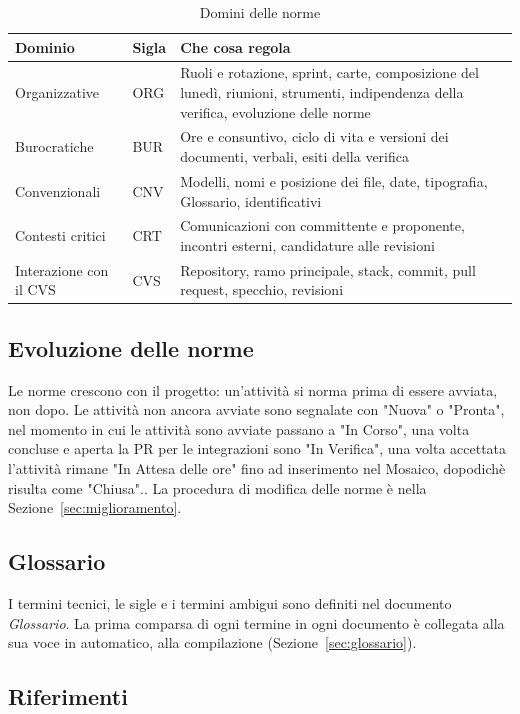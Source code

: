 \documentclass[a4paper, 11pt]{article}
\begin{document}
\begin{table}[htbp]
\centering
\small
\caption{Domini delle norme}
\label{tab:domini}
\begin{tabularx}{\textwidth}{@{} l l X @{}}
\toprule
\textbf{Dominio} & \textbf{Sigla} & \textbf{Che cosa regola} \\
\midrule
Organizzative & ORG & Ruoli e rotazione, sprint, carte, composizione del lunedì, riunioni, strumenti, indipendenza della verifica, evoluzione delle norme \\
Burocratiche & BUR & Ore e consuntivo, ciclo di vita e versioni dei documenti, verbali, esiti della verifica \\
Convenzionali & CNV & Modelli, nomi e posizione dei file, date, tipografia, Glossario, identificativi \\
Contesti critici & CRT & Comunicazioni con committente e proponente, incontri esterni, candidature alle revisioni \\
Interazione con il CVS & CVS & Repository, ramo principale, stack, commit, pull request, specchio, revisioni \\
\bottomrule
\end{tabularx}
\end{table}

\subsection{Evoluzione delle norme}
Le norme crescono con il progetto: un'attività si norma prima di essere avviata, non dopo. Le attività non ancora avviate sono segnalate con "Nuova" o "Pronta", nel momento in cui le attività sono avviate passano a "In Corso", una volta concluse e aperta la PR per le integrazioni sono "In Verifica", una volta accettata l'attività rimane "In Attesa delle ore" fino ad inserimento nel Mosaico, dopodichè risulta come "Chiusa".. La procedura di modifica delle norme è nella Sezione~\ref{sec:miglioramento}.

\subsection{Glossario}
I termini tecnici, le sigle e i termini ambigui sono definiti nel documento \emph{Glossario}. La prima comparsa di ogni termine in ogni documento è collegata alla sua voce in automatico, alla compilazione (Sezione~\ref{sec:glossario}).

\subsection{Riferimenti}
\end{document}
